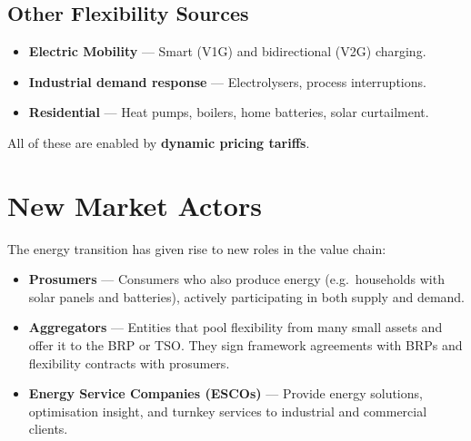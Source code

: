 \subsection*{Other Flexibility Sources}

\begin{itemize}[noitemsep]
    \item \textbf{Electric Mobility} — Smart (V1G) and bidirectional (V2G) charging.
    \item \textbf{Industrial demand response} — Electrolysers, process interruptions.
    \item \textbf{Residential} — Heat pumps, boilers, home batteries, solar curtailment.
\end{itemize}

\noindent All of these are enabled by \textbf{dynamic pricing tariffs}.

\section{New Market Actors}

The energy transition has given rise to new roles in the value chain:

\begin{itemize}[noitemsep]
    \item \textbf{Prosumers} — Consumers who also produce energy (e.g.\ households with solar panels and batteries), actively participating in both supply and demand.
    \item \textbf{Aggregators} — Entities that pool flexibility from many small assets and offer it to the BRP or TSO. They sign framework agreements with BRPs and flexibility contracts with prosumers.
    \item \textbf{Energy Service Companies (ESCOs)} — Provide energy solutions, optimisation insight, and turnkey services to industrial and commercial clients.
\end{itemize}